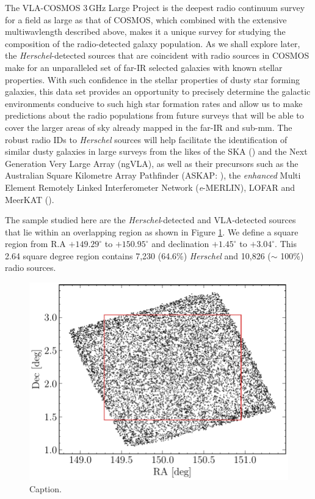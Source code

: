 The VLA-COSMOS 3\,GHz Large Project is the deepest radio continuum survey for a field as large as that of COSMOS, which combined with the extensive multiwavlength described above, makes it a unique survey for studying the composition of the radio-detected galaxy population. As we shall explore later, the \textit{Herschel}-detected sources that are coincident with radio sources in COSMOS make for an unparalleled set of far-IR selected galaxies with known stellar properties. With such confidence in the stellar properties of dusty star forming galaxies, this data set provides an opportunity to precisely determine the galactic environments conducive to such high star formation rates and allow us to make predictions about the radio populations from future surveys that will be able to cover the larger areas of sky already mapped in the far-IR and sub-mm. The robust radio IDs to \textit{Herschel} sources will help facilitate the identification of similar dusty galaxies in large surveys from the likes of the SKA (\citealt{Dewdney_2009}) and the Next Generation Very Large Array (ngVLA), as well as their precursors such as the Australian Square Kilometre Array Pathfinder (ASKAP: \citealt{Johnston_2007}), the \textit{enhanced} Multi Element Remotely Linked Interferometer Network (\textit{e}-MERLIN), LOFAR and MeerKAT (\citealt{Jonas_2009}).

The sample studied here are the \textit{Herschel}-detected and VLA-detected sources that lie within an overlapping region as shown in Figure \ref{fig:sky_map}. We define a square region from R.A $+149.29^{\circ}$ to $+150.95^{\circ}$ and declination $+1.45^{\circ}$ to $+3.04^{\circ}$. This 2.64 square degree region contains 7,230 (64.6\%) \textit{Herschel} and 10,826 ($\sim$ 100\%) radio sources.

\begin{figure}
	\centering
	\includegraphics[width=0.75\columnwidth]{Figures/sky_map.pdf}
	\caption{{\color{red} Caption.}}
	\label{fig:sky_map}
\end{figure}

